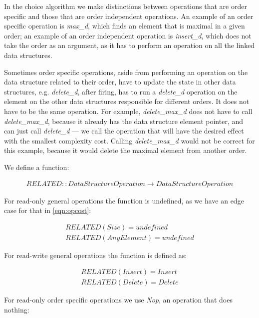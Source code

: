 \documentclass[a4paper,11pt]{article}
\begin{document}
			In the choice algorithm we make distinctions between operations that are order specific and those that are order independent
            operations. An example of an order specific operation is \emph{max\_d}, which finds an element that is maximal in
            a given order; an example of an order independent operation is \emph{insert\_d}, which does not take the order as an argument, as it has to perform an operation on all the linked data structures. 

            Sometimes order specific operations, aside from performing an operation on the data structure related to their order, have to update the state in other data structures, e.g. \emph{delete\_d}, after firing, has to run a \emph{delete\_d} operation on the element on the other data structures responsible for different orders. It does not have to be the same operation. For example, \emph{delete\_max\_d} does not have to call \emph{delete\_max\_d}, because it already has the data structure element pointer, and can just call \emph{delete\_d} --- we call the operation
            that will have the desired effect with the smallest complexity cost. Calling \emph{delete\_max\_d} would not be correct for this example, because it would delete the maximal element from another order.

			We define a function:

			\begin{eqnarray}
                \mathit{RELATED} :: \mathit{DataStructureOperation} \rightarrow \mathit{DataStructureOperation}
            \end{eqnarray}

            For read-only general operations the function is undefined, as we have an edge case for that in \autoref{eqn:opcost}:

			\begin{eqnarray}
                \mathit{RELATED}(Size) = undefined\\
                \mathit{RELATED}(AnyElement) = undefined
            \end{eqnarray}

            For read-write general operations the function is defined as:

			\begin{eqnarray}
                \mathit{RELATED}(Insert) = Insert\\
                \mathit{RELATED}(Delete) = Delete
            \end{eqnarray}

            For read-only order specific operations we use \emph{Nop}, an operation that does nothing:
\end{document}
